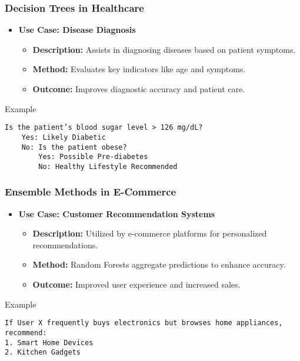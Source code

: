 \documentclass{beamer}
\begin{document}
\begin{frame}[fragile]
    \frametitle{Decision Trees in Healthcare}
    \begin{itemize}
        \item \textbf{Use Case: Disease Diagnosis}
        \begin{itemize}
            \item \textbf{Description:} Assists in diagnosing diseases based on patient symptoms.
            \item \textbf{Method:} Evaluates key indicators like age and symptoms.
            \item \textbf{Outcome:} Improves diagnostic accuracy and patient care.
        \end{itemize}
    \end{itemize}

    \begin{block}{Example}
        \begin{lstlisting}
Is the patient’s blood sugar level > 126 mg/dL?
    Yes: Likely Diabetic
    No: Is the patient obese?
        Yes: Possible Pre-diabetes
        No: Healthy Lifestyle Recommended
        \end{lstlisting}
    \end{block}
\end{frame}

\begin{frame}[fragile]
    \frametitle{Ensemble Methods in E-Commerce}
    \begin{itemize}
        \item \textbf{Use Case: Customer Recommendation Systems}
        \begin{itemize}
            \item \textbf{Description:} Utilized by e-commerce platforms for personalized recommendations.
            \item \textbf{Method:} Random Forests aggregate predictions to enhance accuracy.
            \item \textbf{Outcome:} Improved user experience and increased sales.
        \end{itemize}
    \end{itemize}

    \begin{block}{Example}
        \begin{lstlisting}
If User X frequently buys electronics but browses home appliances, recommend:
1. Smart Home Devices
2. Kitchen Gadgets
        \end{lstlisting}
    \end{block}
\end{frame}
\end{document}
